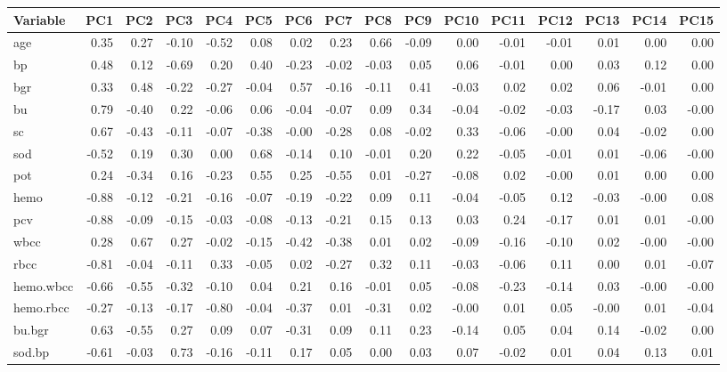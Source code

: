 \begin{table}[ht]
\centering
\begin{tabular}{lrrrrrrrrrrrrrrr}
  \hline
Variable & PC1 & PC2 & PC3 & PC4 & PC5 & PC6 & PC7 & PC8 & PC9 & PC10 & PC11 & PC12 & PC13 & PC14 & PC15 \\ 
  \hline
age & 0.35 & 0.27 & -0.10 & -0.52 & 0.08 & 0.02 & 0.23 & 0.66 & -0.09 & 0.00 & -0.01 & -0.01 & 0.01 & 0.00 & 0.00 \\ 
  bp & 0.48 & 0.12 & -0.69 & 0.20 & 0.40 & -0.23 & -0.02 & -0.03 & 0.05 & 0.06 & -0.01 & 0.00 & 0.03 & 0.12 & 0.00 \\ 
  bgr & 0.33 & 0.48 & -0.22 & -0.27 & -0.04 & 0.57 & -0.16 & -0.11 & 0.41 & -0.03 & 0.02 & 0.02 & 0.06 & -0.01 & 0.00 \\ 
  bu & 0.79 & -0.40 & 0.22 & -0.06 & 0.06 & -0.04 & -0.07 & 0.09 & 0.34 & -0.04 & -0.02 & -0.03 & -0.17 & 0.03 & -0.00 \\ 
  sc & 0.67 & -0.43 & -0.11 & -0.07 & -0.38 & -0.00 & -0.28 & 0.08 & -0.02 & 0.33 & -0.06 & -0.00 & 0.04 & -0.02 & 0.00 \\ 
  sod & -0.52 & 0.19 & 0.30 & 0.00 & 0.68 & -0.14 & 0.10 & -0.01 & 0.20 & 0.22 & -0.05 & -0.01 & 0.01 & -0.06 & -0.00 \\ 
  pot & 0.24 & -0.34 & 0.16 & -0.23 & 0.55 & 0.25 & -0.55 & 0.01 & -0.27 & -0.08 & 0.02 & -0.00 & 0.01 & 0.00 & 0.00 \\ 
  hemo & -0.88 & -0.12 & -0.21 & -0.16 & -0.07 & -0.19 & -0.22 & 0.09 & 0.11 & -0.04 & -0.05 & 0.12 & -0.03 & -0.00 & 0.08 \\ 
  pcv & -0.88 & -0.09 & -0.15 & -0.03 & -0.08 & -0.13 & -0.21 & 0.15 & 0.13 & 0.03 & 0.24 & -0.17 & 0.01 & 0.01 & -0.00 \\ 
  wbcc & 0.28 & 0.67 & 0.27 & -0.02 & -0.15 & -0.42 & -0.38 & 0.01 & 0.02 & -0.09 & -0.16 & -0.10 & 0.02 & -0.00 & -0.00 \\ 
  rbcc & -0.81 & -0.04 & -0.11 & 0.33 & -0.05 & 0.02 & -0.27 & 0.32 & 0.11 & -0.03 & -0.06 & 0.11 & 0.00 & 0.01 & -0.07 \\ 
  hemo.wbcc & -0.66 & -0.55 & -0.32 & -0.10 & 0.04 & 0.21 & 0.16 & -0.01 & 0.05 & -0.08 & -0.23 & -0.14 & 0.03 & -0.00 & -0.00 \\ 
  hemo.rbcc & -0.27 & -0.13 & -0.17 & -0.80 & -0.04 & -0.37 & 0.01 & -0.31 & 0.02 & -0.00 & 0.01 & 0.05 & -0.00 & 0.01 & -0.04 \\ 
  bu.bgr & 0.63 & -0.55 & 0.27 & 0.09 & 0.07 & -0.31 & 0.09 & 0.11 & 0.23 & -0.14 & 0.05 & 0.04 & 0.14 & -0.02 & 0.00 \\ 
  sod.bp & -0.61 & -0.03 & 0.73 & -0.16 & -0.11 & 0.17 & 0.05 & 0.00 & 0.03 & 0.07 & -0.02 & 0.01 & 0.04 & 0.13 & 0.01 \\ 
   \hline
\end{tabular}
\end{table}
